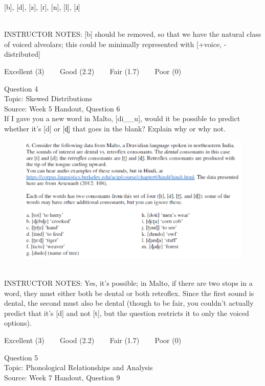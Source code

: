 \documentclass[12pt]{article}
\begin{document}
{[b]}, {[d]}, {[z]}, {[ɾ]}, {[n]}, {[l]}, {[ɹ]}


~\\
INSTRUCTOR NOTES: [b] should be removed, so that we have the natural class of voiced alveolars; this could be minimally represented with [+voice, -distributed]


\vfill
Excellent (3) ~~~ Good (2.2) ~~~ Fair (1.7) ~~~ Poor (0)
\newpage

{\large Question 4}\\

Topic: Skewed Distributions\\
Source: Week 5 Handout, Question 6\\

If I gave you a new word in Malto, [di\_\_u], would it be possible to predict whether it's [d] or [ɖ] that goes in the blank? Explain why or why not.\\

\begin{figure}[H]
\includegraphics{../images/malto.png}
\end{figure}

~\\
INSTRUCTOR NOTES: Yes, it's possible; in Malto, if there are two stops in a word, they must either both be dental or both retroflex. Since the first sound is dental, the second must also be dental (though to be fair, you couldn't actually predict that it's [d] and not [t], but the question restricts it to only the voiced options).


\vfill
Excellent (3) ~~~ Good (2.2) ~~~ Fair (1.7) ~~~ Poor (0)
\newpage

{\large Question 5}\\

Topic: Phonological Relationships and Analysis\\
Source: Week 7 Handout, Question 9\\
\end{document}
